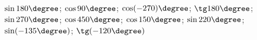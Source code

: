 \begin{ex}[type=calculate]
	\begin{condition}
		\( \sin180\degree \); \( \cos90\degree \); \( \cos(-270)\degree \); \( \tg180\degree \); \( \sin270\degree \);  \( \cos450\degree \); \( \cos150\degree \); \( \sin220\degree \); \( \sin(-135\degree) \); \( \tg(-120\degree) \)
	\end{condition}
\end{ex}